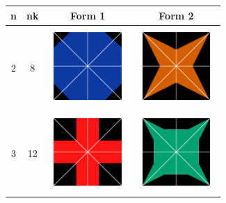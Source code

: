 \documentclass{beamer}
\begin{document}
\begin{frame}
\begin{table}
\centering
\begin{tabular}{c|c|c|c}
n & nk& Form 1 & Form 2\\\hline
2 & 8 & \includegraphics[width=3cm]{8tv}&\includegraphics[width=3cm]{8se} \\\hline
3 & 12 & \includegraphics[width=3cm]{12tv} &\includegraphics[width=3cm]{12se}\\\hline
\end{tabular}
\end{table}
\end{frame}
\end{document}
